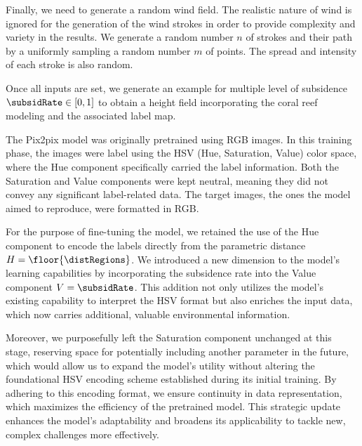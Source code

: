 

Finally, we need to generate a random wind field. The realistic nature of wind is ignored for the generation of the wind strokes in order to provide complexity and variety in the results. 
We generate a random number $n$ of strokes and their path by a uniformly sampling a random number $m$ of points. The spread and intensity of each stroke is also random.

Once all inputs are set, we generate an example for multiple level of subsidence $\subsidRate \in [0, 1]$ to obtain a height field incorporating the coral reef modeling and the associated label map. 

The Pix2pix model was originally pretrained using RGB images. In this training phase, the images were label using the HSV (Hue, Saturation, Value) color space, where the Hue component specifically carried the label information. Both the Saturation and Value components were kept neutral, meaning they did not convey any significant label-related data. The target images, the ones the model aimed to reproduce, were formatted in RGB.

For the purpose of fine-tuning the model, we retained the use of the Hue component to encode the labels  directly from the parametric distance $H = \floor{\distRegions}$. We introduced a new dimension to the model's learning capabilities by incorporating the subsidence rate into the Value component $V =\subsidRate$. This addition not only utilizes the model's existing capability to interpret the HSV format but also enriches the input data, which now carries additional, valuable environmental information.

Moreover, we purposefully left the Saturation component unchanged at this stage, reserving space for potentially including another parameter in the future, which would allow us to expand the model's utility without altering the foundational HSV encoding scheme established during its initial training. By adhering to this encoding format, we ensure continuity in data representation, which maximizes the efficiency of the pretrained model. This strategic update enhances the model's adaptability and broadens its applicability to tackle new, complex challenges more effectively.


